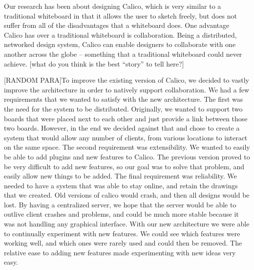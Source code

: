 Our research has been about designing Calico, which is very similar to a traditional whiteboard in that it allows the user to sketch freely, but does not suffer from all of the disadvantages that a whiteboard does. One advantage Calico has over a traditional whiteboard is collaboration. Being a distributed, networked design system, Calico can enable designers to collaborate with one another across the globe – something that a traditional whiteboard could never achieve. [what do you think is the best ``story'' to tell here?]

[RANDOM PARA]To improve the existing version of Calico, we decided to vastly improve the architecture in order to natively support collaboration. We had a few requirements that we wanted to satisfy with the new architecture. The first was the need for the system to be distributed. Originally, we wanted to support two boards that were placed next to each other and just provide a link between those two boards. However, in the end we decided against that and chose to create a system that would allow any number of clients, from various locations to interact on the same space. The second requirement was extensibility. We wanted to easily be able to add plugins and new features to Calico. The previous version proved to be very difficult to add new features, so our goal was to solve that problem, and easily allow new things to be added. The final requirement was reliability. We needed to have a system that was able to stay online, and retain the drawings that we created. Old versions of calico would crash, and then all designs would be lost. By having a centralized server, we hope that the server would be able to outlive client crashes and problems, and could be much more stable because it was not handling any graphical interface. With our new architecture we were able to continually experiment with new features. We could see which features were working well, and which ones were rarely used and could then be removed. The relative ease to adding new features made experimenting with new ideas very easy.
